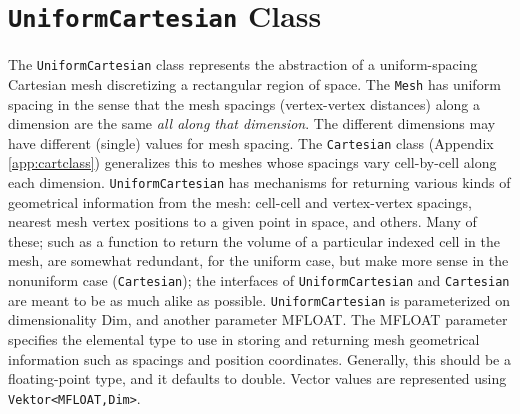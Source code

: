 \section{\texttt{UniformCartesian} Class} 
\label{app:unifcart}
The \texttt{UniformCartesian} class represents the abstraction of a uniform-spacing Cartesian mesh discretizing a rectangular region of space. The \texttt{Mesh} has 
uniform spacing in the sense that the mesh spacings (vertex-vertex distances) along a dimension are the same {\it all along that dimension}. The different dimensions 
may have different (single) values for mesh spacing. The \texttt{Cartesian} class (Appendix \ref{app:cartclass}) generalizes this to meshes whose spacings vary cell-by-cell along each 
dimension. \texttt{UniformCartesian} has mechanisms for returning various kinds of geometrical information from the mesh: cell-cell and vertex-vertex spacings, 
nearest mesh vertex positions to a given point in space, and others. Many of these; such as a function to return the volume of a particular indexed cell in the mesh, 
are somewhat redundant, for the uniform case, but make more sense in the nonuniform case (\texttt{Cartesian}); the interfaces of \texttt{UniformCartesian} and 
\texttt{Cartesian} are meant to be as much alike as possible. 
\texttt{UniformCartesian} is parameterized on dimensionality Dim, and another parameter MFLOAT. The MFLOAT parameter specifies the elemental type to use 
in storing and returning mesh geometrical information such as spacings and position coordinates. Generally, this should be a floating-point type, and it defaults 
to double. Vector values are represented using \texttt{Vektor<MFLOAT,Dim>}. 

